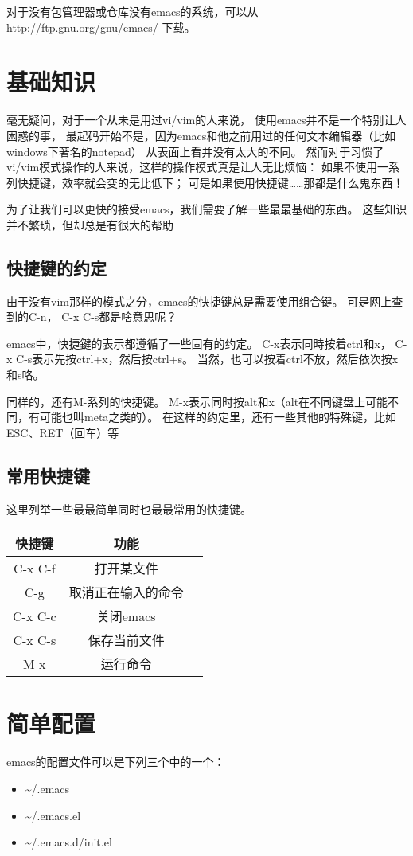 \documentclass{article}
\begin{document}
对于没有包管理器或仓库没有emacs的系统，可以从
\url{http://ftp.gnu.org/gnu/emacs/}
下载。
\section{基础知识}
\label{sec-4}
毫无疑问，对于一个从未是用过vi/vim的人来说，
使用emacs并不是一个特别让人困惑的事，
最起码开始不是，因为emacs和他之前用过的任何文本编辑器（比如windows下著名的notepad）
从表面上看并没有太大的不同。
然而对于习惯了vi/vim模式操作的人来说，这样的操作模式真是让人无比烦恼：
如果不使用一系列快捷键，效率就会变的无比低下；
可是如果使用快捷键……那都是什么鬼东西！

为了让我们可以更快的接受emacs，我们需要了解一些最最基础的东西。
这些知识并不繁琐，但却总是有很大的帮助
\subsection{快捷键的约定}
\label{sec-4-1}
由于没有vim那样的模式之分，emacs的快捷键总是需要使用组合键。
可是网上查到的C-n， C-x C-s都是啥意思呢？

emacs中，快捷鍵的表示都遵循了一些固有的约定。
C-x表示同時按着ctrl和x，
C-x C-s表示先按ctrl+x，然后按ctrl+s。
当然，也可以按着ctrl不放，然后依次按x和s咯。

同样的，还有M-系列的快捷键。
M-x表示同时按alt和x（alt在不同键盘上可能不同，有可能也叫meta之类的）。
在这样的约定里，还有一些其他的特殊键，比如ESC、RET（回车）等
\subsection{常用快捷键}
\label{sec-4-2}
这里列举一些最最简单同时也最最常用的快捷键。
\begin{center}
\begin{tabular}{|c|c|c|}
\hline
快捷键 & 功能\\
\hline
C-x C-f & 打开某文件\\
C-g & 取消正在输入的命令\\
C-x C-c & 关闭emacs\\
C-x C-s & 保存当前文件\\
M-x & 运行命令\\
\hline
\end{tabular}
\end{center}
\section{简单配置}
\label{sec-5}
emacs的配置文件可以是下列三个中的一个：
\begin{itemize}
\item \textasciitilde{}/.emacs
\item \textasciitilde{}/.emacs.el
\item \textasciitilde{}/.emacs.d/init.el
\end{itemize}
\end{document}
